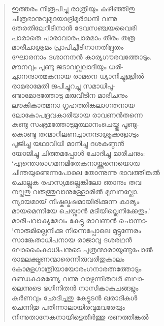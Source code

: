 \begin{verse}
ഇത്തരം നിരൂപിച്ചു രാത്രിയും കഴിഞ്ഞിതു\\
ചിത്രഭാനുവുമുദയാദ്രിമൂര്‍ദ്ധനി വന്നു\\
തേരതിലേറീടിനാന്‍ ദേവസഞ്ചയവൈരി\\
പാരാതെ പാരാവാരപാരമാം തീരം തത്ര\\
മാരീചാശ്രമം പ്രാപിച്ചീടിനാനതിദ്രുതം\\
ഘോരനാം ദശാനനന്‍ കാര്യഗൗരവത്തോടും.\\
മൗനവും പൂണ്ടു ജടാവല്ക്കലാദിയും ധരി-\\
ച്ചാനന്ദാത്മകനായ രാമനെ ധ്യാനിച്ചുള്ളില്‍\\
രാമരാമേതി ജപിച്ചുറച്ചു സമാധിപൂ-\\
ണ്ടാമോദത്തോടു മരുവീടിന മാരീചനും\\
ലൗകികാത്മനാ ഗൃഹത്തിങ്കലാഗതനായ\\
ലോകോപദ്രവകാരിയായ രാവണന്‍തന്നെ\\
കണ്ടു സംഭ്രമത്തോടുമുത്ഥാനംചെയ്തു പൂണ്ടു-\\
കൊണ്ടു തന്മാറിലണച്ചാനന്ദാശ്രുക്കളോടും\\
പൂജിച്ചു യഥാവിധി മാനിച്ചു ദശകണ്ഠന്‍\\
യോജിച്ചു ചിത്തമപ്പോള്‍ ചോദിച്ചു മാരീചനും:\\
‘എന്തൊരാഗമനമിതേകനായ്ത്തന്നെയൊരു\\
ചിന്തയുണ്ടെന്നപോലെ തോന്നുന്നു ഭാവത്തിങ്കല്‍\\
ചൊല്ലുക രഹസ്യമല്ലെങ്കിലോ ഞാനും തവ\\
നല്ലതു വരുത്തുവാനുള്ളോരില്‍ മുമ്പനല്ലോ.\\
ന്യായമായ് നിഷ്കല്മഷമായിരിക്കുന്ന കാര്യം\\
മായമെന്നിയേ ചെയ്വാന്‍ മടിയില്ലെനിക്കേതും.’\\
മാരീചവാക്യമേവം കേട്ടു രാവണന്‍ ചൊന്നാ-\\
‘നാരുമില്ലെനിക്കു നിന്നെപ്പോലെ മുട്ടുന്നേരം\\
സാങ്കേതാധിപനായ രാജാവു ദശരഥന്‍\\
ലോകൈകാധിപനുടെ പുത്രന്മാരായുണ്ടുപോല്‍\\
രാമലക്ഷ്മണന്മാരെന്നിരുവരിതുകാലം\\
കോമളഗാത്രിയായോരംഗനാരത്നത്തോടും\\
ദണ്ഡകാരണ്യേ വന്നു വാഴുന്നിതവര്‍ ബലാ-\\
ലെന്നുടെ ഭഗിനിതന്‍ നാസികാകുചങ്ങളും\\
കര്‍ണവും ഛേദിച്ചതു കേട്ടുടന്‍ ഖരാദികള്‍\\
ചെന്നിതു പതിന്നാലായിരവുമവരേയും\\
നിന്നുതാനേകനായിട്ടെതിര്‍ത്തു രണത്തിങ്കല്‍\\

\end{verse}
